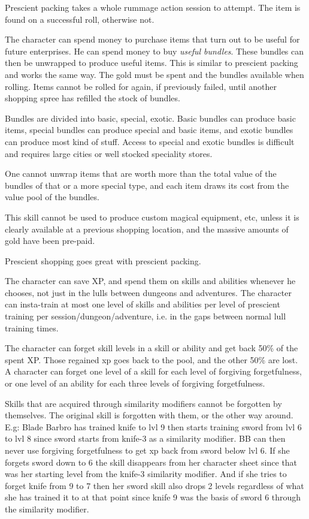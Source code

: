 Prescient packing takes a whole rummage action session to attempt. The item is found on a successful roll, otherwise not.


 The character can spend money to purchase items that turn out to be useful for future enterprises. He can spend money to buy \emph{useful bundles}. These bundles can then be unwrapped to produce useful items. This is similar to prescient packing and works the same way.
The gold must be spent and the bundles available when rolling. Items cannot be rolled for again, if previously failed, until another shopping spree has refilled the stock of bundles.

Bundles are divided into basic, special, exotic. Basic bundles can produce basic items, special bundles can produce special and basic items, and exotic bundles can produce most kind of stuff. Access to special and exotic bundles is difficult and requires large cities or well stocked speciality stores.

One cannot unwrap items that are worth more than the total value of the bundles of that or a more special type, and each item draws its cost from the value pool of the bundles.

This skill cannot be used to produce custom magical equipment, etc, unless it is clearly available at a previous shopping location, and the massive amounts of gold have been pre-paid.

Prescient shopping goes great with prescient packing.


 The character can save XP, and spend them on skills and abilities whenever he chooses, not just in the lulls between dungeons and adventures. The character can insta-train at most one level of skills and abilities per level of prescient training per session/dungeon/adventure, i.e. in the gaps between normal lull training times.


 The character can forget skill levels in a skill or ability and get back 50\% of the spent XP. Those regained xp goes back to the pool, and the other 50\% are lost.
A character can forget one level of a skill for each level of forgiving forgetfulness, or one level of an ability for each three levels of forgiving forgetfulness.

Skills that are acquired through similarity modifiers cannot be forgotten by themselves. The original skill is forgotten with them, or the other way around.
E.g: Blade Barbro has trained knife to lvl 9 then starts training sword from lvl 6 to lvl 8 since sword starts from knife-3 as a similarity modifier. BB can then never use forgiving forgetfulness to get xp back from sword below lvl 6. If she forgets sword down to 6 the skill disappears from her character sheet since that was her starting level from the knife-3 similarity modifier.
And if she tries to forget knife from 9 to 7 then her sword skill also drops 2 levels regardless of what she has trained it to at that point since knife 9 was the basis of sword 6 through the similarity modifier.



